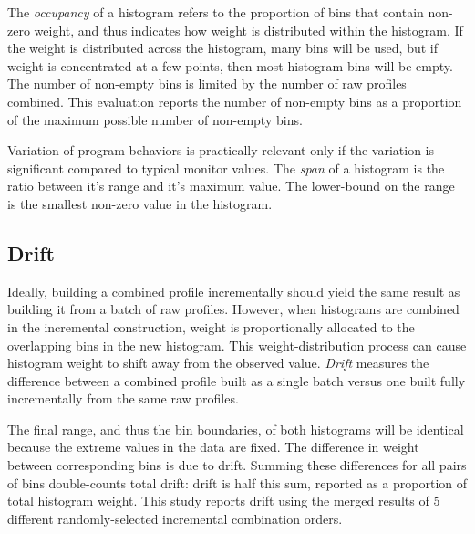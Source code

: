 
The {\it occupancy} of a histogram refers to the proportion of bins
that contain non-zero weight, and thus indicates how weight is
distributed within the histogram.  If the weight is distributed across
the histogram, many bins will be used, but if weight is concentrated
at a few points, then most histogram bins will be empty.  The number
of non-empty bins is limited by the number of raw profiles combined.
This evaluation reports the number of non-empty bins as a proportion
of the maximum possible number of non-empty bins.


Variation of program behaviors is practically relevant only if the
variation is significant compared to typical monitor values.  The {\it
span} of a histogram is the ratio between it's range and it's maximum
value.  The lower-bound on the range is the smallest non-zero value in
the histogram.

\subsection{Drift}

Ideally, building a combined profile incrementally should yield the
same result as building it from a batch of raw profiles.  However,
when histograms are combined in the incremental construction, weight
is proportionally allocated to the overlapping bins in the new
histogram.  This weight-distribution process can cause histogram
weight to shift away from the observed value. {\it Drift} measures the
difference between a combined profile built as a single batch versus
one built fully incrementally from the same raw profiles.

The final range, and thus the bin boundaries, of both histograms 
will be identical because the extreme values in the data are fixed.
The difference in weight between corresponding bins is due to drift.
Summing these differences for all pairs of bins double-counts total
drift: drift is half this sum, reported as a proportion of total
histogram weight. This study reports drift using the merged results of
5 different randomly-selected incremental combination orders.


